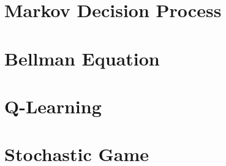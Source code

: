 \section{Markov Decision Process}

\section{Bellman Equation}

\section{Q-Learning}

\section{Stochastic Game}